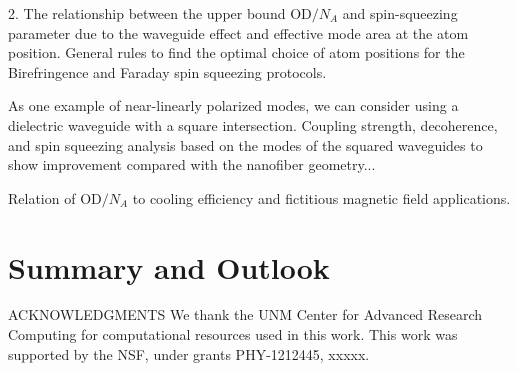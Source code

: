 \documentclass[pra,twocolumn,floatfix,superscriptaddress]{revtex4-1} %
\begin{document}
2. The relationship between the upper bound OD$ /N_A $ and spin-squeezing parameter due to the waveguide effect and effective mode area at the atom position. 
General rules to find the optimal choice of atom positions for the Birefringence and Faraday spin squeezing protocols.


As one example of near-linearly polarized modes, we can consider using a dielectric waveguide with a square intersection. 
Coupling strength, decoherence, and spin squeezing analysis based on the modes of the squared waveguides to show improvement compared with the nanofiber geometry...

Relation of OD$ /N_A $ to cooling efficiency and fictitious magnetic field applications.

\section{Summary and Outlook} \label{Sec::Conclusion}


ACKNOWLEDGMENTS
We thank the UNM Center for Advanced Research Computing for computational resources used in this work.
This work was supported by the NSF, under grants PHY-1212445, xxxxx.


\end{document}

